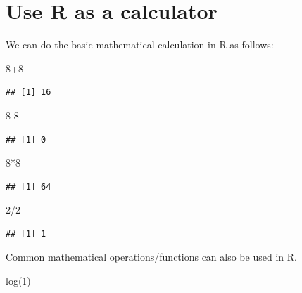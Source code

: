 \documentclass[
  11pt,
]{book}
\newenvironment{Shaded}{\begin{snugshade}}{\end{snugshade}}
\newcommand{\DecValTok}[1]{\textcolor[rgb]{0.00,0.00,0.81}{#1}}
\newcommand{\FunctionTok}[1]{\textcolor[rgb]{0.00,0.00,0.00}{#1}}
\newcommand{\NormalTok}[1]{#1}
\newcommand{\SpecialCharTok}[1]{\textcolor[rgb]{0.00,0.00,0.00}{#1}}
\begin{document}
\hypertarget{use-r-as-a-calculator}{%
\section{Use R as a calculator}\label{use-r-as-a-calculator}}

We can do the basic mathematical calculation in R as follows:

\begin{Shaded}
\begin{Highlighting}[]
\DecValTok{8}\SpecialCharTok{+}\DecValTok{8}
\end{Highlighting}
\end{Shaded}

\begin{verbatim}
## [1] 16
\end{verbatim}

\begin{Shaded}
\begin{Highlighting}[]
\DecValTok{8{-}8}
\end{Highlighting}
\end{Shaded}

\begin{verbatim}
## [1] 0
\end{verbatim}

\begin{Shaded}
\begin{Highlighting}[]
\DecValTok{8}\SpecialCharTok{*}\DecValTok{8}
\end{Highlighting}
\end{Shaded}

\begin{verbatim}
## [1] 64
\end{verbatim}

\begin{Shaded}
\begin{Highlighting}[]
\DecValTok{2}\SpecialCharTok{/}\DecValTok{2}
\end{Highlighting}
\end{Shaded}

\begin{verbatim}
## [1] 1
\end{verbatim}

Common mathematical operations/functions can also be used in R.

\begin{Shaded}
\begin{Highlighting}[]
\FunctionTok{log}\NormalTok{(}\DecValTok{1}\NormalTok{)}
\end{Highlighting}
\end{Shaded}
\end{document}
